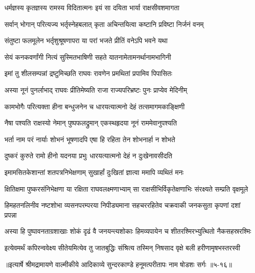 \twolineshloka
{धर्मज्ञस्य कृतज्ञस्य रामस्य विदितात्मनः}
{इयं सा दयिता भार्या राक्षसीवशमागता} %

\twolineshloka
{सर्वान् भोगान् परित्यज्य भर्तृस्नेहबलात् कृता}
{अचिन्तयित्वा कष्टानि प्रविष्टा निर्जनं वनम्} %

\twolineshloka
{संतुष्टा फलमूलेन भर्तृशुश्रूषणापरा}
{या परां भजते प्रीतिं वनेऽपि भवने यथा} %

\twolineshloka
{सेयं कनकवर्णांगी नित्यं सुस्मितभाषिणी}
{सहते यातनामेतामनर्थानामभागिनी} %

\twolineshloka
{इमां तु शीलसम्पन्नां द्रष्टुमिच्छति राघवः}
{रावणेन प्रमथितां प्रपामिव पिपासितः} %

\twolineshloka
{अस्या नूनं पुनर्लाभाद् राघवः प्रीतिमेष्यति}
{राजा राज्यपरिभ्रष्टः पुनः प्राप्येव मेदिनीम्} %

\twolineshloka
{कामभोगैः परित्यक्ता हीना बन्धुजनेन च}
{धारयत्यात्मनो देहं तत्समागमकाङ्क्षिणी} %

\twolineshloka
{नैषा पश्यति राक्षस्यो नेमान् पुष्पफलद्रुमान्}
{एकस्थहृदया नूनं राममेवानुपश्यति} %

\twolineshloka
{भर्ता नाम परं नार्याः शोभनं भूषणादपि}
{एषा हि रहिता तेन शोभनार्हा न शोभते} %

\twolineshloka
{दुष्करं कुरुते रामो हीनो यदनया प्रभुः}
{धारयत्यात्मनो देहं न दुःखेनावसीदति} %

\twolineshloka
{इमामसितकेशान्तां शतपत्रनिभेक्षणाम्}
{सुखार्हां दुःखितां ज्ञात्वा ममापि व्यथितं मनः} %

\twolineshloka
{क्षितिक्षमा पुष्करसंनिभेक्षणा या रक्षिता राघवलक्ष्मणाभ्याम्}
{सा राक्षसीभिर्विकृतेक्षणाभिः संरक्ष्यते सम्प्रति वृक्षमूले} %

\twolineshloka
{हिमहतनलिनीव नष्टशोभा व्यसनपरम्परया निपीड्यमाना}
{सहचररहितेव चक्रवाकी जनकसुता कृपणां दशां प्रपन्ना} %

\twolineshloka
{अस्या हि पुष्पावनताग्रशाखाः शोकं दृढं वै जनयन्त्यशोकाः}
{हिमव्यपायेन च शीतरश्मिरभ्युत्थितो नैकसहस्ररश्मिः} %

\twolineshloka
{इत्येवमर्थं कपिरन्ववेक्ष्य सीतेयमित्येव तु जातबुद्धिः}
{संश्रित्य तस्मिन् निषसाद वृक्षे बली हरीणामृषभस्तरस्वी} %


॥इत्यार्षे श्रीमद्रामायणे वाल्मीकीये आदिकाव्ये सुन्दरकाण्डे हनूमत्परीतापः नाम षोडशः सर्गः ॥५-१६॥
